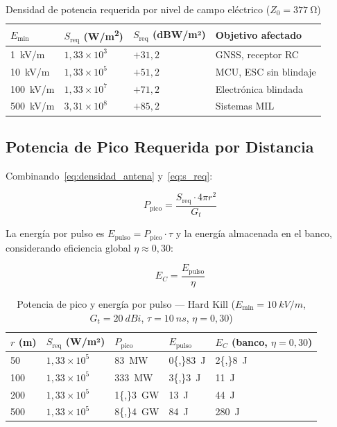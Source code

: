 \documentclass[12pt,a4paper]{article}
\begin{document}
\begin{table}[H]
\centering
\caption{Densidad de potencia requerida por nivel de campo eléctrico ($Z_0 = \SI{377}{\ohm}$)}
\label{tab:s_campo}
\renewcommand{\arraystretch}{1.3}
\begin{tabularx}{\textwidth}{XXXX}
\toprule
$E_\mathrm{min}$ &
$S_\mathrm{req}$ (\si{W/m^2}) &
$S_\mathrm{req}$ (dBW/m²) &
Objetivo afectado \\
\midrule
\SI{1}{kV/m}   & $1{,}33 \times 10^3$ & $+31{,}2$ & GNSS, receptor RC \\
\SI{10}{kV/m}  & $1{,}33 \times 10^5$ & $+51{,}2$ & MCU, ESC sin blindaje \\
\SI{100}{kV/m} & $1{,}33 \times 10^7$ & $+71{,}2$ & Electrónica blindada \\
\SI{500}{kV/m} & $3{,}31 \times 10^8$ & $+85{,}2$ & Sistemas MIL \\
\bottomrule
\end{tabularx}
\end{table}

\subsection{Potencia de Pico Requerida por Distancia}

Combinando~\eqref{eq:densidad_antena} y~\eqref{eq:s_req}:

\begin{equation}
  P_\mathrm{pico} = \frac{S_\mathrm{req} \cdot 4\pi r^2}{G_t}
  \label{eq:ppico}
\end{equation}

La energía por pulso es $E_\mathrm{pulso} = P_\mathrm{pico} \cdot \tau$
y la energía almacenada en el banco, considerando eficiencia global
$\eta \approx 0{,}30$:

\begin{equation}
  E_C = \frac{E_\mathrm{pulso}}{\eta}
  \label{eq:ec}
\end{equation}

\begin{table}[H]
\centering
\caption{Potencia de pico y energía por pulso — Hard Kill ($E_\mathrm{min} = \SI{10}{kV/m}$,
         $G_t = \SI{20}{dBi}$, $\tau = \SI{10}{ns}$, $\eta = 0{,}30$)}
\label{tab:ppico}
\renewcommand{\arraystretch}{1.3}
\begin{tabularx}{\textwidth}{XXXXX}
\toprule
$r$ (m) &
$S_\mathrm{req}$ (W/m²) &
$P_\mathrm{pico}$ &
$E_\mathrm{pulso}$ &
$E_C$ (banco, $\eta = 0{,}30$) \\
\midrule
50   & $1{,}33 \times 10^5$ & \SI{83}{MW}    & \SI{0{,}83}{J} & \SI{2{,}8}{J}  \\
100  & $1{,}33 \times 10^5$ & \SI{333}{MW}   & \SI{3{,}3}{J}  & \SI{11}{J}     \\
200  & $1{,}33 \times 10^5$ & \SI{1{,}3}{GW} & \SI{13}{J}     & \SI{44}{J}     \\
500  & $1{,}33 \times 10^5$ & \SI{8{,}4}{GW} & \SI{84}{J}     & \SI{280}{J}    \\
\bottomrule
\end{tabularx}
\end{table}
\end{document}

